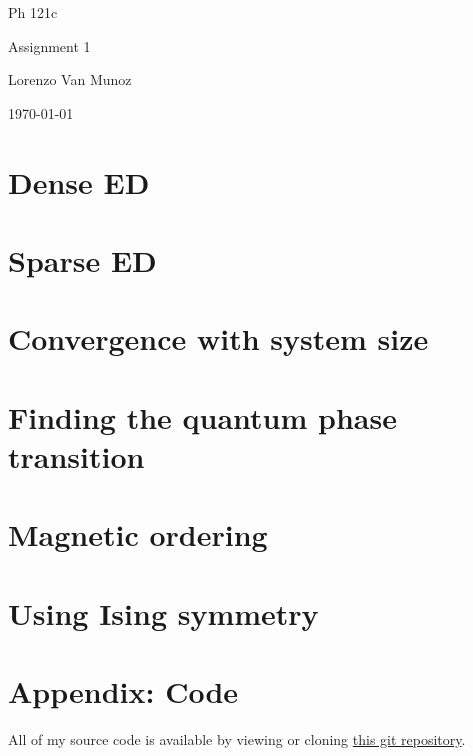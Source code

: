 \documentclass{article}
\begin{document}
{\centering

Ph 121c

Assignment 1

Lorenzo Van Munoz

\today

}

\tableofcontents

\newpage

\section{
Dense ED
}



\newpage

\section{
Sparse ED
}



\newpage

\section{
Convergence with system size
}



\newpage

\section{
Finding the quantum phase transition
}



\newpage

\section{
Magnetic ordering
}



\newpage

\section{
Using Ising symmetry
}



\newpage

\section{
Appendix: Code
}

All of my source code is available by viewing or cloning
\href{https://github.com/lxvm/ph121c.git}{this git repository}.
\end{document}
